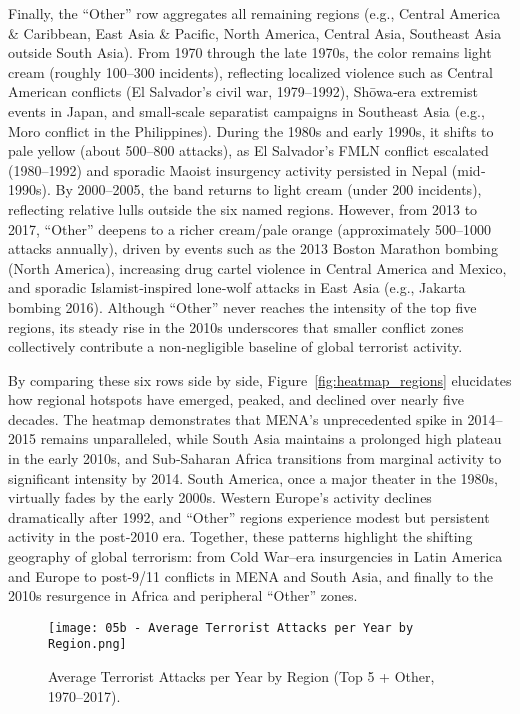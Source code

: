 Finally, the “Other” row aggregates all remaining regions (e.g., Central America \& Caribbean, East Asia \& Pacific, North America, Central Asia, Southeast Asia outside South Asia). From 1970 through the late 1970s, the color remains light cream (roughly 100–300 incidents), reflecting localized violence such as Central American conflicts (El Salvador’s civil war, 1979–1992), Shōwa‐era extremist events in Japan, and small‐scale separatist campaigns in Southeast Asia (e.g., Moro conflict in the Philippines). During the 1980s and early 1990s, it shifts to pale yellow (about 500–800 attacks), as El Salvador’s FMLN conflict escalated (1980–1992) and sporadic Maoist insurgency activity persisted in Nepal (mid‐1990s). By 2000–2005, the band returns to light cream (under 200 incidents), reflecting relative lulls outside the six named regions. However, from 2013 to 2017, “Other” deepens to a richer cream/pale orange (approximately 500–1000 attacks annually), driven by events such as the 2013 Boston Marathon bombing (North America), increasing drug cartel violence in Central America and Mexico, and sporadic Islamist‐inspired lone‐wolf attacks in East Asia (e.g., Jakarta bombing 2016). Although “Other” never reaches the intensity of the top five regions, its steady rise in the 2010s underscores that smaller conflict zones collectively contribute a non‐negligible baseline of global terrorist activity.

By comparing these six rows side by side, Figure~\ref{fig:heatmap_regions} elucidates how regional hotspots have emerged, peaked, and declined over nearly five decades. The heatmap demonstrates that MENA’s unprecedented spike in 2014–2015 remains unparalleled, while South Asia maintains a prolonged high plateau in the early 2010s, and Sub‐Saharan Africa transitions from marginal activity to significant intensity by 2014. South America, once a major theater in the 1980s, virtually fades by the early 2000s. Western Europe’s activity declines dramatically after 1992, and “Other” regions experience modest but persistent activity in the post‐2010 era. Together, these patterns highlight the shifting geography of global terrorism: from Cold War–era insurgencies in Latin America and Europe to post‐9/11 conflicts in MENA and South Asia, and finally to the 2010s resurgence in Africa and peripheral “Other” zones.  

\vspace{0.5em}
\begin{figure}[ht]
  \centering
  \texttt{[image: 05b - Average Terrorist Attacks per Year by Region.png]}
  \caption{Average Terrorist Attacks per Year by Region (Top 5 + Other, 1970–2017).}
  \label{fig:avg_attacks_region}
\end{figure}


